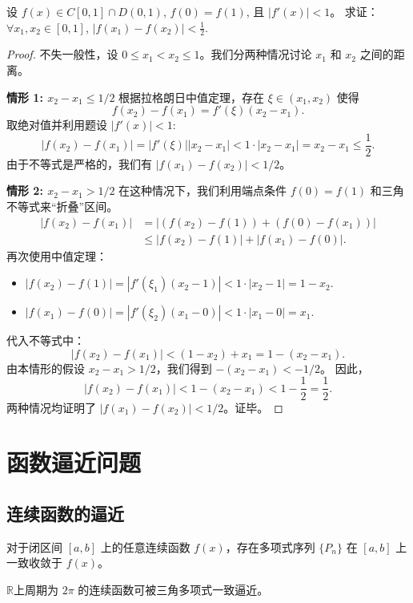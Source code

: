 \documentclass[lang=cn,10pt,thmcnt=section]{elegantbook}
\begin{document}
\begin{example}
    设 \( f(x) \in C[0,1] \cap D(0,1) \), \( f(0) = f(1) \), 且 \( |f'(x)| < 1 \)。  
求证：\( \forall x_1, x_2 \in [0,1] \), \( |f(x_1) - f(x_2)| < \frac{1}{2} \).
\end{example}
\begin{proof}
    不失一般性，设 $0 \le x_1 < x_2 \le 1$。我们分两种情况讨论 $x_1$ 和 $x_2$ 之间的距离。
    
    \textbf{情形 1: \(x_2 - x_1 \le 1/2\)}
    根据拉格朗日中值定理，存在 $\xi \in (x_1, x_2)$ 使得
    \[
    f(x_2) - f(x_1) = f'(\xi)(x_2 - x_1).
    \]
    取绝对值并利用题设 $|f'(x)| < 1$:
    \[
    |f(x_2) - f(x_1)| = |f'(\xi)| |x_2 - x_1| < 1 \cdot |x_2 - x_1| = x_2 - x_1 \le \frac{1}{2}.
    \]
    由于不等式是严格的，我们有 $|f(x_1) - f(x_2)| < 1/2$。
    
    \textbf{情形 2: \(x_2 - x_1 > 1/2\)}
    在这种情况下，我们利用端点条件 $f(0)=f(1)$ 和三角不等式来“折叠”区间。
    \begin{align*}
        |f(x_2) - f(x_1)| &= |(f(x_2)-f(1)) + (f(0)-f(x_1))| \\
        &\le |f(x_2)-f(1)| + |f(x_1)-f(0)|.
    \end{align*}
    再次使用中值定理：
    \begin{itemize}
        \item $|f(x_2)-f(1)| = |f'(\xi_1)(x_2-1)| < 1 \cdot |x_2-1| = 1-x_2$.
        \item $|f(x_1)-f(0)| = |f'(\xi_2)(x_1-0)| < 1 \cdot |x_1-0| = x_1$.
    \end{itemize}
    代入不等式中：
    \[
    |f(x_2) - f(x_1)| < (1-x_2) + x_1 = 1 - (x_2-x_1).
    \]
    由本情形的假设 $x_2 - x_1 > 1/2$，我们得到 $-(x_2-x_1) < -1/2$。
    因此，
    \[
    |f(x_2) - f(x_1)| < 1 - (x_2 - x_1) < 1 - \frac{1}{2} = \frac{1}{2}.
    \]
    两种情况均证明了 $|f(x_1) - f(x_2)| < 1/2$。证毕。
\end{proof}

\section{函数逼近问题}
\subsection{连续函数的逼近}
\begin{theorem}
	对于闭区间 $[a, b]$ 上的任意连续函数 $f(x)$，存在多项式序列 $\{P_n\}$ 在 $[a, b]$ 上一致收敛于 $f(x)$。
\end{theorem}
\begin{theorem}
	$\mathbb{R}$上周期为 $2\pi$ 的连续函数可被三角多项式一致逼近。
\end{theorem}
\end{document}
